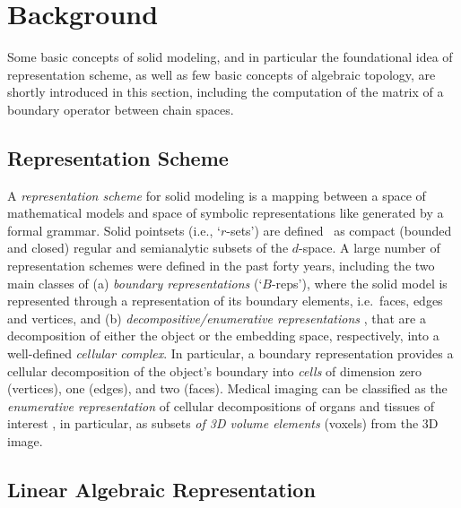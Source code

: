 
\section{Background}\label{sec:background}

Some basic concepts of solid modeling, and in particular the foundational idea of representation scheme, as well as few basic concepts of algebraic topology, are shortly introduced in this section, including the computation of the matrix of a boundary operator between chain spaces.

\subsection{Representation Scheme}\label{sec:schemes}

A \emph{representation scheme} for solid modeling is a mapping between a space of mathematical models and  space of symbolic representations like generated by a formal grammar.
Solid pointsets (i.e., `$r$-sets') are defined~\cite{Requicha:1980:RRS:356827.356833} as compact (bounded and closed) regular and semianalytic subsets of the $d$-space. A large number of representation schemes were defined in the past forty years, including the two main classes of (a) \emph{boundary representations} (`$B$-reps'), where the solid model is represented through a representation of its boundary elements, i.e.~faces, edges and vertices, and (b) \emph{decompositive/enumerative representations} \cite{Requicha:1980:RRS:356827.356833}, that are a decomposition of either the object or the embedding space, respectively, into a well-defined \emph{cellular complex}. In particular, a boundary representation provides a cellular decomposition of the object's boundary into \emph{cells} of dimension zero (vertices), one (edges), and two (faces). Medical imaging can be classified as the \emph{enumerative representation} of cellular decompositions of organs and tissues of interest \cite{Paoluzzi2016}, in particular, as subsets \emph{of 3D volume elements} (voxels) from the 3D image. 


\subsection{Linear Algebraic Representation}\label{sec:lar}


